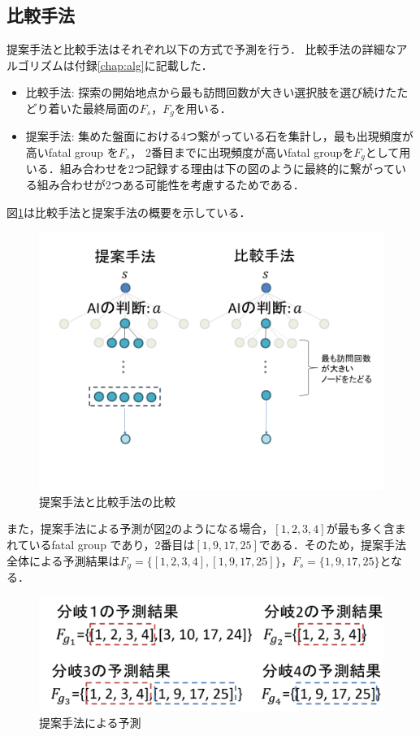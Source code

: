 \subsection{比較手法}
提案手法と比較手法はそれぞれ以下の方式で予測を行う．
比較手法の詳細なアルゴリズムは付録\ref{chap:alg}に記載した．
\newpage
\begin{itemize}
	\item 比較手法: 探索の開始地点から最も訪問回数が大きい選択肢を選び続けたたどり着いた最終局面の$F_s， F_g$を用いる．
	\item 提案手法: 集めた盤面における4つ繋がっている石を集計し，最も出現頻度が高いfatal group を$F_s$， 2番目までに出現頻度が高いfatal groupを$F_g$として用いる．組み合わせを2つ記録する理由は下の図のように最終的に繋がっている組み合わせが2つある可能性を考慮するためである．
\end{itemize}
図\ref{fig:compare}は比較手法と提案手法の概要を示している．
\begin{figure}[t]
	\centering
	\includegraphics[width=\linewidth]{./figure/compare-image.png}
	\caption{提案手法と比較手法の比較}
	\label{fig:compare}
\end{figure}
また，提案手法による予測が図\ref{fig:g-example}のようになる場合，$[1,2,3,4]$が最も多く含まれているfatal group
であり，2番目は$[1, 9, 17, 25]$である．そのため，提案手法全体による予測結果は$F_g=\{[1, 2, 3, 4], [1, 9, 17, 25]\}， F_s=\{1, 9, 17, 25\}$となる．
\begin{figure}[t]
	\centering
	\includegraphics[width=\linewidth]{./figure/g-example.png}
	\caption{提案手法による予測}
	\label{fig:g-example}
\end{figure}

